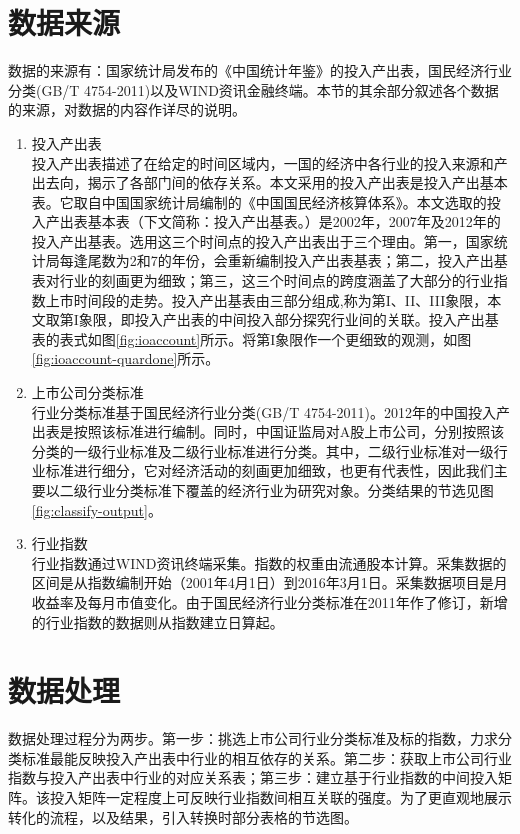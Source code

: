 \documentclass{sysuthesis}
\begin{document}
\section{数据来源}
数据的来源有：国家统计局发布的《中国统计年鉴》的投入产出表，国民经济行业分类(GB/T 4754-2011)以及WIND资讯金融终端。本节的其余部分叙述各个数据的来源，对数据的内容作详尽的说明。
\begin{enumerate}
	\item {投入产出表}\\
	投入产出表描述了在给定的时间区域内，一国的经济中各行业的投入来源和产出去向，揭示了各部门间的依存关系\cite{_2002_????}。本文采用的投入产出表是投入产出基本表。它取自中国国家统计局编制的《中国国民经济核算体系》。本文选取的投入产出表基本表（下文简称：投入产出基表。）是2002年，2007年及2012年的投入产出基表。选用这三个时间点的投入产出表出于三个理由。第一，国家统计局每逢尾数为2和7的年份，会重新编制投入产出表基表；第二，投入产出基表对行业的刻画更为细致；第三，这三个时间点的跨度涵盖了大部分的行业指数上市时间段的走势。投入产出基表由三部分组成,称为第I、II、III象限，本文取第I象限，即投入产出表的中间投入部分探究行业间的关联。投入产出基表的表式如图\ref{fig:ioaccount}所示。将第I象限作一个更细致的观测，如图\ref{fig:ioaccount-quardone}所示。

  \item {上市公司分类标准}\\
  行业分类标准基于国民经济行业分类(GB/T 4754-2011)。2012年的中国投入产出表是按照该标准进行编制。同时，中国证监局\cite{_wind_????}对A股上市公司，分别按照该分类的一级行业标准及二级行业标准进行分类。其中，二级行业标准对一级行业标准进行细分，它对经济活动的刻画更加细致，也更有代表性，因此我们主要以二级行业分类标准下覆盖的经济行业为研究对象。分类结果的节选见图\ref{fig:classify-output}。

	\item {行业指数}\\
	行业指数通过WIND资讯终端采集。指数的权重由流通股本计算。采集数据的区间是从指数编制开始（2001年4月1日）到2016年3月1日。采集数据项目是月收益率及每月市值变化。由于国民经济行业分类标准在2011年作了修订，新增的行业指数的数据则从指数建立日算起。
\end{enumerate}

\section{数据处理}

数据处理过程分为两步。第一步：挑选上市公司行业分类标准及标的指数，力求分类标准最能反映投入产出表中行业的相互依存的关系。第二步：获取上市公司行业指数与投入产出表中行业的对应关系表；第三步：建立基于行业指数的中间投入矩阵。该投入矩阵一定程度上可反映行业指数间相互关联的强度。为了更直观地展示转化的流程，以及结果，引入转换时部分表格的节选图。
\end{document}
